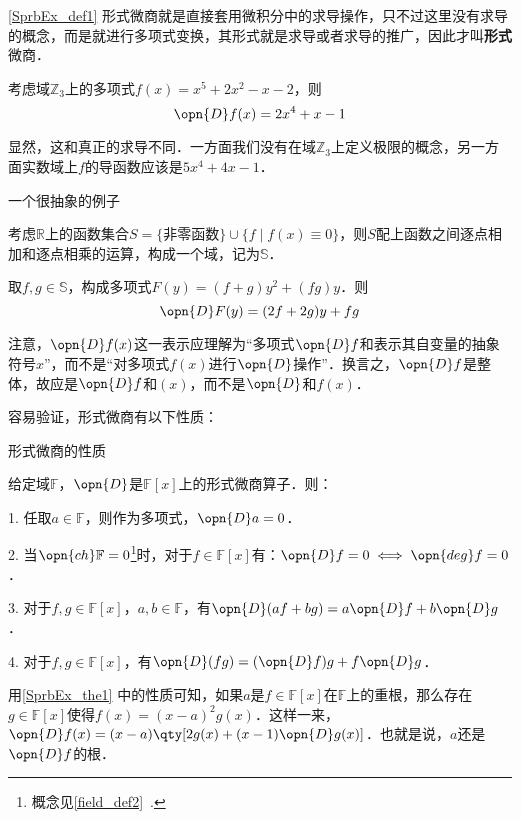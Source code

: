 \autoref{SprbEx_def1} 形式微商就是直接套用微积分中的求导操作，只不过这里没有求导的概念，而是就进行多项式变换，其形式就是求导或者求导的推广，因此才叫\textbf{形式}微商．

\begin{example}{}
考虑域$\mathbb{Z}_3$上的多项式$f(x)=x^5+2x^2-x-2$，则
\begin{equation}
\opn{D}f(x) = 2x^4+x-1
\end{equation}

显然，这和真正的求导不同．一方面我们没有在域$\mathbb{Z}_3$上定义极限的概念，另一方面实数域上$f$的导函数应该是$5x^4+4x-1$．
\end{example}

\begin{example}{一个很抽象的例子}

考虑$\mathbb{R}$上的函数集合$S=\{\text{非零函数}\}\cup\{f\mid f(x)\equiv 0\}$，则$S$配上函数之间逐点相加和逐点相乘的运算，构成一个域，记为$\mathbb{S}$．

取$f, g\in\mathbb{S}$，构成多项式$F(y)=(f+g)y^2+(fg)y$．则
\begin{equation}
\opn{D}F(y) = (2f+2g)y+fg
\end{equation}

\end{example}

注意，$\opn{D}f(x)$这一表示应理解为“多项式$\opn{D}f$和表示其自变量的抽象符号$x$”，而不是“对多项式$f(x)$进行$\opn{D}$操作”．换言之，$\opn{D}f$是整体，故应是$\opn{D}f$和$(x)$，而不是$\opn{D}$和$f(x)$．

容易验证，形式微商有以下性质：

\begin{theorem}{形式微商的性质}\label{SprbEx_the1}

给定域$\mathbb{F}$，$\opn{D}$是$\mathbb{F}[x]$上的形式微商算子．则：

1. 任取$a\in\mathbb{F}$，则作为多项式，$\opn{D}a=0$．

2. 当$\opn{ch}\mathbb{F}=0$\footnote{概念见\autoref{field_def2}~. }时，对于$f\in\mathbb{F}[x]$有：$\opn{D}f=0 \iff \opn{deg}f=0$．

3. 对于$f, g\in\mathbb{F}[x]$，$a, b\in\mathbb{F}$，有$\opn{D}(af+bg)=a\opn{D}f+b\opn{D}g$．

4. 对于$f, g\in\mathbb{F}[x]$，有$\opn{D}(fg) = (\opn{D}f)g+f\opn{D}g$．

\end{theorem}

用\autoref{SprbEx_the1} 中的性质可知，如果$a$是$f\in\mathbb{F}[x]$在$\mathbb{F}$上的重根，那么存在$g\in\mathbb{F}[x]$使得$f(x)=(x-a)^2g(x)$．这样一来，$\opn{D}f(x)=(x-a)\qty[2g(x)+(x-1)\opn{D}g(x)]$．也就是说，$a$还是$\opn{D}f$的根．

